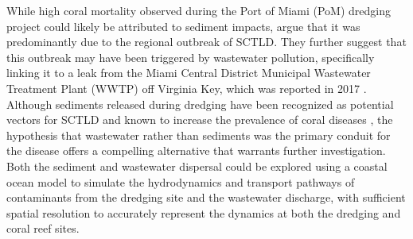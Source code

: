 \documentclass[preprint,12pt,authoryear]{elsarticle}
\begin{document}
While high coral mortality observed during the Port of Miami (PoM) dredging project could likely be attributed to sediment impacts, \cite{gintert2019regional} argue that it was predominantly due to the regional outbreak of SCTLD. They further suggest that this outbreak may have been triggered by wastewater pollution, specifically linking it to a leak from the Miami Central District Municipal Wastewater Treatment Plant (WWTP) off Virginia Key, which was reported in 2017 \citep{staletovich2017}. Although sediments released during dredging have been recognized as potential vectors for SCTLD \citep{studivan2022reef} and known to increase the prevalence of coral diseases \citep{pollock2014sediment}, the hypothesis that wastewater rather than sediments was the primary conduit for the disease offers a compelling alternative that warrants further investigation. Both the sediment and wastewater dispersal could be explored using a coastal ocean model to simulate the hydrodynamics and transport pathways of contaminants from the dredging site and the wastewater discharge, with sufficient spatial resolution to accurately represent the dynamics at both the dredging and coral reef sites.
\end{document}
